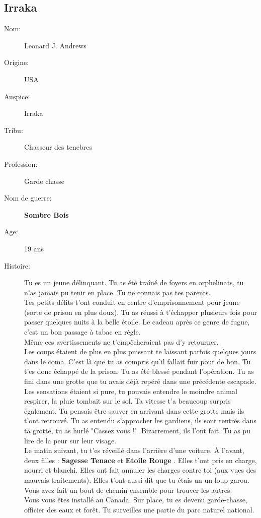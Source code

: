 \documentclass[oneside,12pt]{book}
\newcommand{\Lynn}{\textbf{Etoile Rouge} }
\newcommand{\Jessica}{\textbf{Sagesse Tenace} }
\newcommand{\Leonard}{\textbf{Sombre Bois} }
\begin{document}
\begin{flushleft}
\section{Irraka}
\begin{description}
\item[Nom:]{Leonard J. Andrews}
\item[Origine:]{USA}
\item[Auspice:]{Irraka}
\item[Tribu:]{Chasseur des tenebres}
\item[Profession:]{Garde chasse}
\item[Nom de guerre:]{\Leonard}
\item[Age:]{19 ans}
\item[Histoire:]{
Tu es un jeune délinquant. Tu as été traîné de foyers en orphelinats, tu n'as jamais pu tenir en place. 
Tu ne connais pas tes parents.\\ 
Tes petits délits t'ont conduit en centre d'emprisonnement pour jeune (sorte de prison en plus doux). 
Tu as réussi à t'échapper plusieurs fois pour passer quelques nuits à la belle étoile. 
Le cadeau après ce genre de fugue, c'est un bon passage à tabac en règle. \\
Même ces avertissements ne t'empêcheraient pas d'y retourner. \\
Les coups étaient de plus en plus puissant te laissant parfois quelques jours dans le coma. 
C'est là que tu as compris qu'il fallait fuir pour de bon. Tu t'es donc échappé de la prison. 
Tu as été blessé pendant l'opération. Tu as fini dans une grotte que tu avais déjà repéré dans une précédente escapade. Les sensations étaient si pure, tu pouvais entendre le moindre animal respirer, la pluie tombait sur le sol. Ta vitesse t'a beaucoup surpris également. Tu pensais être sauver en arrivant dans cette grotte mais ils t'ont retrouvé.
Tu as entendu s'approcher les gardiens, ils sont rentrés dans ta grotte, tu as hurlé "Cassez vous !". 
Bizarrement, ils l'ont fait. Tu as pu lire de la peur sur leur visage. \\
Le matin suivant, tu t'es réveillé dans l'arrière d'une voiture. À l'avant, deux filles : \Jessica et \Lynn. Elles t'ont pris en charge, nourri et blanchi. 
Elles ont fait annuler les charges contre toi (aux vues des mauvais traitements). Elles t'ont aussi dit que tu étais un un loup-garou. Vous avez fait un bout de chemin ensemble pour trouver les autres. \\
Vous vous êtes installé au Canada. Sur place, tu es devenu garde-chasse, officier des eaux et forêt. Tu surveilles une  partie du parc naturel national. \\ 
}
\end{description}
\end{flushleft}
\end{document}
